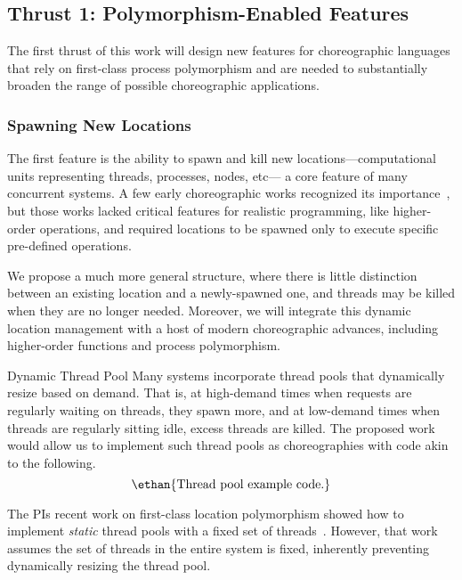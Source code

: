 
\subsection{Thrust 1: Polymorphism-Enabled Features}
\label{sec:t1}

The first thrust of this work will design new features for choreographic languages
that rely on first-class process polymorphism and
are needed to substantially broaden the range of possible choreographic applications.

\subsubsection{Spawning New Locations}
\label{sec:spawning}

The first feature is the ability to spawn and kill new locations---computational units representing threads, processes, nodes, etc---%
a core feature of many concurrent systems.
A few early choreographic works recognized its importance~\citep{CarboneM13,CruzFilipeM16a},
but those works lacked critical features for realistic programming, like higher-order operations,
and required locations to be spawned only to execute specific pre-defined operations.

We propose a much more general structure, where there is little distinction between an existing location and a newly-spawned one,
and threads may be killed when they are no longer needed.
Moreover, we will integrate this dynamic location management with a host of modern choreographic advances,
including higher-order functions and process polymorphism.

\begin{example}{Dynamic Thread Pool}
Many systems incorporate thread pools that dynamically resize based on demand.
That is, at high-demand times when requests are regularly waiting on threads, they spawn more,
and at low-demand times when threads are regularly sitting idle, excess threads are killed.
The proposed work would allow us to implement such thread pools as choreographies
with code akin to the following.
\[
  \text{\ethan{Thread pool example code.}}
\]

The PIs recent work on first-class location polymorphism showed how to
implement \emph{static} thread pools with a fixed set of threads~\citep{SamuelsonHC25}.
However, that work assumes the set of threads in the entire system is fixed,
inherently preventing dynamically resizing the thread pool.
\end{example}

